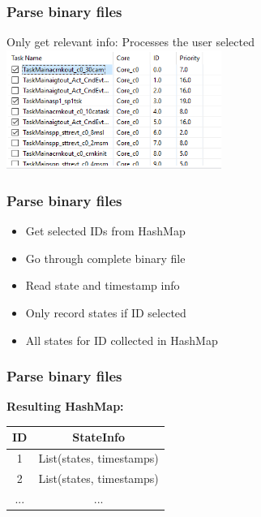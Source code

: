 \documentclass{beamer}
\begin{document}
\begin{frame}
	\frametitle{Parse binary files}
	Only get relevant info: Processes the user selected
	\includegraphics[width = 7cm]{table.png}
\end{frame}

\begin{frame}
	\frametitle{Parse binary files}
	\begin{block}{}
		\begin{itemize}
			\item Get selected IDs from HashMap 
			\item Go through complete binary file
			\item Read state and timestamp info
			\item Only record states if ID selected
			\item All states for ID collected in HashMap
		\end{itemize}
	\end{block}
\end{frame}

\begin{frame}
	\frametitle{Parse binary files}
	\textbf{Resulting HashMap:}\\
	\vspace{1cm}
\begin{tabular}{|c|c|}
		\hline 
		\textbf{ID} & \textbf{StateInfo}  \\
		\hline 
		1 & List(states, timestamps) \\
		\hline 
		2 & List(states, timestamps)  \\ 
		\hline 
		... & ...  \\ 
		\hline 
	\end{tabular}
\end{frame}
\end{document}
